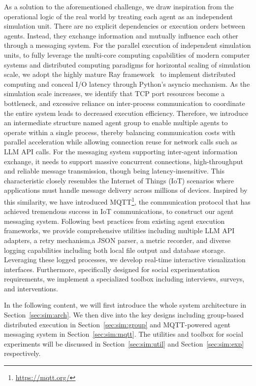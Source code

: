 As a solution to the aforementioned challenge, we draw inspiration from the operational logic of the real world by treating each agent as an independent simulation unit.
There are no explicit dependencies or execution orders between agents.
Instead, they exchange information and mutually influence each other through a messaging system.
For the parallel execution of independent simulation units, to fully leverage the multi-core computing capabilities of modern computer systems and distributed computing paradigms for horizontal scaling of simulation scale, we adopt the highly mature Ray framework~\cite{moritz2018ray} to implement distributed computing and conceal I/O latency through Python's asyncio mechanism.
As the simulation scale increases, we identify that TCP port resources become a bottleneck, and excessive reliance on inter-process communication to coordinate the entire system leads to decreased execution efficiency.
Therefore, we introduce an intermediate structure named agent group to enable multiple agents to operate within a single process, thereby balancing communication costs with parallel acceleration while allowing connection reuse for network calls such as LLM API calls.
For the messaging system supporting inter-agent information exchange, it needs to support massive concurrent connections, high-throughput and reliable message transmission, though being latency-insensitive.
This characteristic closely resembles the Internet of Things (IoT) scenarios where applications must handle message delivery across millions of devices.
Inspired by this similarity, we have introduced MQTT\footnote{\url{https://mqtt.org/}}, the communication protocol that has achieved tremendous success in IoT communications, to construct our agent messaging system.
Following best practices from existing agent execution frameworks, we provide comprehensive utilities including multiple LLM API adapters, a retry mechanism,a JSON parser, a metric recorder, and diverse logging capabilities including both local file output and database storage.
Leveraging these logged processes, we develop real-time interactive visualization interfaces.
Furthermore, specifically designed for social experimentation requirements, we implement a specialized toolbox including interviews, surveys, and interventions.

In the following content, we will first introduce the whole system architecture in Section~\ref{sec:sim:arch}.
We then dive into the key designs including group-based distributed execution in Section~\ref{sec:sim:group} and MQTT-powered agent messaging system in Section~\ref{sec:sim:mqtt}.
The utilities and toolbox for social experiments will be discussed in Section~\ref{sec:sim:util} and Section~\ref{sec:sim:exp} respectively.

